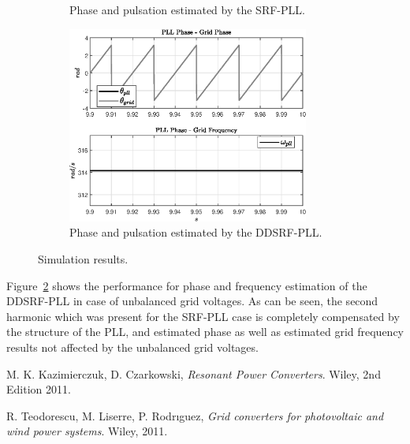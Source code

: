 \documentclass[11pt,a4paper,oneside]{book}
\numberwithin{equation}{section}
\theoremstyle{it}
\theoremstyle{definition}
\begin{document}
\begin{onehalfspace}
\begin{figure}[H]
\begin{subfigure}{0.5\textwidth}
		\caption{Phase and pulsation estimated by the SRF-PLL.}
		\label{grid_phase_srf_pll_fig_2}
	\end{subfigure}%
	\begin{subfigure}{0.5\textwidth}
		\centering
		\includegraphics[width = 225pt, angle = 0, 
		keepaspectratio]{figures/pll/grid_phase_ddsrf_pll_fig_2.eps}
		\captionsetup{width=0.65\textwidth, font=footnotesize}	
		\caption{Phase and pulsation estimated by the DDSRF-PLL.}
		\label{grid_phase_ddsrf_pll_fig_2}
	\end{subfigure}
	\captionsetup{width=0.5\textwidth, font=small}	
	\caption{Simulation results.}
	\label{}
\end{figure}
Figure~\ref{grid_phase_ddsrf_pll_fig_2} shows the performance for phase and frequency estimation of the DDSRF-PLL in case of unbalanced grid voltages. As can be seen, the second harmonic which was present for the SRF-PLL case is completely compensated by the structure of the PLL, and estimated phase as well as estimated grid frequency results not affected by the unbalanced grid voltages. 

\begin{thebibliography}{99}
	M. K. Kazimierczuk, D. Czarkowski, \emph{Resonant Power Converters}. Wiley, 2nd Edition 2011.

	R. Teodorescu, M. Liserre, P. Rodrıguez, \emph{Grid converters for photovoltaic and wind power systems}. Wiley, 2011.
\end{thebibliography}

\end{onehalfspace}
\end{document}

